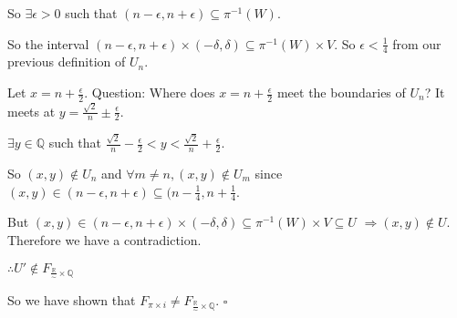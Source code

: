 \documentclass{article}
\begin{document}
So $\exists \epsilon >0$ such that $(n-\epsilon, n+\epsilon)\subseteq \pi^{-1}(W)$.

So the interval $(n-\epsilon, n+\epsilon)\times (-\delta, \delta)\subseteq \pi^{-1}(W)\times V$. So $\epsilon < \frac{1}{4}$ from our previous definition of $U_n$.

Let $x = n + \frac{\epsilon}{2}$. Question: Where does $x = n + \frac{\epsilon}{2}$ meet the boundaries of $U_n$? It meets at $y = \frac{\sqrt{2}}{n} \pm \frac{\epsilon}{2}$.

$\exists y \in \mathbb{Q}$ such that $\frac{\sqrt{2}}{n} - \frac{\epsilon}{2} < y < \frac{\sqrt{2}}{n} + \frac{\epsilon}{2}$.

So $(x,y) \notin U_n$ and $\forall m\neq n, (x,y)\notin U_m$ since $(x,y) \in (n-\epsilon, n+\epsilon)\subseteq (n-\frac{1}{4}, n+\frac{1}{4}$.

But $(x,y) \in (n-\epsilon, n+\epsilon) \times (-\delta, \delta) \subseteq \pi^{-1}(W) \times V \subseteq U$ $\Rightarrow (x,y) \notin U$. Therefore we have a contradiction.

$\therefore U' \notin F_{\frac{\mathbb{R}}{\sim} \times \mathbb{Q}}$

So we have shown that $F_{\pi\times i} \neq F_{\frac{\mathbb{R}}{\sim} \times \mathbb{Q}}$. $\square$
\end{document}
